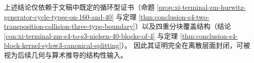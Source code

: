 \begin{remark}
上述结论仅依赖于文稿中既定的循环型证书（命题 \ref{prop:xi-terminal-zm-hurwitz-generator-cycle-types-on-160-and-40} 与定理 \ref{thm:conclusion-s4-two-transposition-collision-three-type-boundary}）以及四重分块覆盖结构（结论 \ref{con:xi-terminal-zm-s4-to-s3-nielsen-40-blocks-of-4} 与定理 \ref{thm:conclusion-s4-block-kernel-sylow3-canonical-splitting}）。
因此其证明完全在离散层面封闭，可被视为后续几何与算术推导的结构性输入。
\end{remark}

